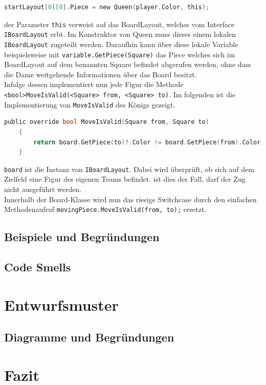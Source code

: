 \documentclass[
10pt, %
a4paper, %
oneside, %
headinclude,footinclude, %
BCOR5mm, %
]{scrartcl}
\begin{document}
	\begin{lstlisting}[language=c, style=mStyle]
	startLayout[0][0].Piece = new Queen(player.Color, this);
	\end{lstlisting}

	 der Parameter \texttt{this} verweist auf das BoardLayout, welches vom Interface \texttt{IBoardLayout} erbt. Im Konstruktor von Queen muss dieses einem lokalen \texttt{IBoardLayout} zugeteilt werden. Daraufhin kann über diese lokale Variable beispielsweise mit \texttt{variable.GetPiece(Square)} das Piece welches sich im BoardLayout auf dem benannten Square befindet abgerufen werden, ohne dass die Dame weitgehende Informationen über das Board besitzt.\\
	 Infolge dessen implementiert nun jede Figur die Methode \texttt{<bool>MoveIsValid(<Square> from, <Square> to)}. Im folgenden ist die Implementierung von \texttt{MoveIsValid} des Königs gezeigt.

	 \begin{lstlisting}[language=c, style=mStyle]
	public override bool MoveIsValid(Square from, Square to)
	{
		return board.GetPiece(to)?.Color != board.GetPiece(from).Color;
	}
	 \end{lstlisting}
	
	 \texttt{board} ist die Instanz von \texttt{IBoardLayout}. Dabei wird überprüft, ob sich auf dem Zielfeld eine Figur des eigenen Teams befindet. ist dies der Fall, darf der Zug nicht ausgeführt werden.\\
	 Innerhalb der Board-Klasse wird nun das riesige Switchcase durch den einfachen Methodenaufruf \texttt{movingPiece.MoveIsValid(from, to);} ersetzt.


\subsection{Beispiele und Begründungen}

\subsection{Code Smells}

\section{Entwurfsmuster}
\subsection{Diagramme und Begründungen}

\section{Fazit}\label{sec:end}


%


\end{document}
